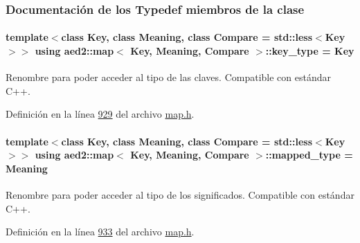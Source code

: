 \subsubsection{Documentación de los \textquotesingle{}Typedef\textquotesingle{} miembros de la clase}
\paragraph[{\texorpdfstring{key\+\_\+type}{key_type}}]{\setlength{\rightskip}{0pt plus 5cm}template$<$class Key, class Meaning, class Compare = std\+::less$<$\+Key$>$$>$ using {\bf aed2\+::map}$<$ Key, Meaning, Compare $>$\+::{\bf key\+\_\+type} =  Key}\hypertarget{classaed2_1_1map_a4273e8812e7105a618df58a2c8b72b7d_a4273e8812e7105a618df58a2c8b72b7d}{}\label{classaed2_1_1map_a4273e8812e7105a618df58a2c8b72b7d_a4273e8812e7105a618df58a2c8b72b7d}


Renombre para poder acceder al tipo de las claves. Compatible con estándar C++. 



Definición en la línea \hyperlink{map_8h_source_l00929}{929} del archivo \hyperlink{map_8h_source}{map.\+h}.

\paragraph[{\texorpdfstring{mapped\+\_\+type}{mapped_type}}]{\setlength{\rightskip}{0pt plus 5cm}template$<$class Key, class Meaning, class Compare = std\+::less$<$\+Key$>$$>$ using {\bf aed2\+::map}$<$ Key, Meaning, Compare $>$\+::{\bf mapped\+\_\+type} =  Meaning}\hypertarget{classaed2_1_1map_aa3e34bf624f3009884a71b18f4ddae40_aa3e34bf624f3009884a71b18f4ddae40}{}\label{classaed2_1_1map_aa3e34bf624f3009884a71b18f4ddae40_aa3e34bf624f3009884a71b18f4ddae40}


Renombre para poder acceder al tipo de los significados. Compatible con estándar C++. 



Definición en la línea \hyperlink{map_8h_source_l00933}{933} del archivo \hyperlink{map_8h_source}{map.\+h}.

